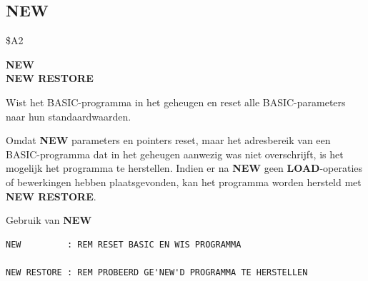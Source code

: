 \newpage
\subsection{NEW}
\begin{description}[leftmargin=2cm,style=nextline]
\item [Token:]    \$A2

\item [Formaat:]   {\bf NEW} \\                 {\bf NEW RESTORE}

\item [Gebruik:]    Wist het BASIC-programma in het geheugen en reset alle BASIC-parameters naar hun standaardwaarden.

                  Omdat {\bf NEW} parameters en pointers reset, maar het adresbereik van een BASIC-programma dat in het geheugen aanwezig was niet overschrijft, is het mogelijk het programma te herstellen. Indien er na {\bf NEW} geen {\bf LOAD}-operaties of bewerkingen hebben plaatsgevonden, kan het programma worden hersteld met {\bf NEW RESTORE}.

\item [Voorbeelden:] Gebruik van {\bf NEW}

\begin{tcolorbox}[colback=black,coltext=white]
\verbatimfont{\codefont}
\begin{verbatim}
NEW         : REM RESET BASIC EN WIS PROGRAMMA

NEW RESTORE : REM PROBEERD GE'NEW'D PROGRAMMA TE HERSTELLEN
\end{verbatim}
\end{tcolorbox}
\end{description}


\newpage
